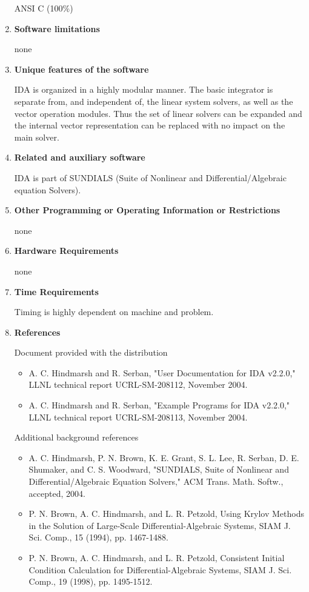 \documentclass[12pt]{letter}
\begin{document}
\begin{letter}
\begin{enumerate}
ANSI C (100\%)

\item {\bf Software limitations}

none

\item {\bf Unique features of the software}

IDA is organized in a highly modular manner. The basic integrator
is separate from, and independent of, the linear system 
solvers, as well as the vector operation modules. Thus the set of linear solvers can be 
expanded and the internal vector representation can be replaced with no impact on 
the main solver.

\item {\bf Related and auxiliary software}

IDA is part of SUNDIALS (Suite of Nonlinear and Differential/Algebraic equation 
Solvers). 

\item {\bf Other Programming or Operating Information or Restrictions}

none


\item {\bf Hardware Requirements}

none


\item {\bf Time Requirements}

Timing is highly dependent on machine and problem.


\item {\bf References}

Document provided with the distribution
\begin{itemize}
\item A. C. Hindmarsh and R. Serban, "User Documentation for IDA v2.2.0," 
    LLNL technical report UCRL-SM-208112, November 2004.
\item A. C. Hindmarsh and R. Serban, "Example Programs for IDA v2.2.0," 
    LLNL technical report UCRL-SM-208113, November 2004.
\end{itemize}
Additional background references
\begin{itemize}
\item A. C. Hindmarsh, P. N. Brown, K. E. Grant, S. L. Lee, R. Serban, 
    D. E. Shumaker, and C. S. Woodward, "SUNDIALS, Suite of Nonlinear and 
    Differential/Algebraic Equation Solvers," ACM Trans. Math. Softw., 
    accepted, 2004.
\item P. N. Brown, A. C. Hindmarsh, and L. R. Petzold, Using Krylov Methods 
    in the Solution of Large-Scale Differential-Algebraic Systems, 
    SIAM J. Sci. Comp., 15 (1994), pp. 1467-1488.
\item P. N. Brown, A. C. Hindmarsh, and L. R. Petzold, Consistent Initial 
    Condition Calculation for Differential-Algebraic Systems, 
    SIAM J. Sci. Comp., 19 (1998), pp. 1495-1512.
\end{itemize}
\end{enumerate}

\end{letter}
\end{document}

